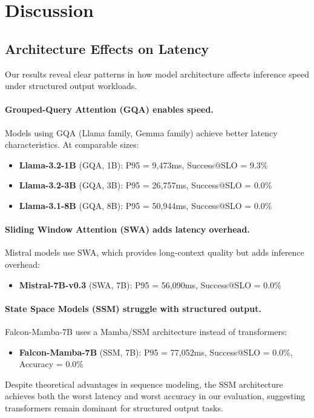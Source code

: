\documentclass[11pt]{article}
\begin{document}
\section{Discussion}
\label{sec:discussion}

\subsection{Architecture Effects on Latency}

Our results reveal clear patterns in how model architecture affects inference speed under structured output workloads.

\paragraph{Grouped-Query Attention (GQA) enables speed.}
Models using GQA (Llama family, Gemma family) achieve better latency characteristics.
At comparable sizes:
\begin{itemize}[leftmargin=12pt]
    \item \textbf{Llama-3.2-1B} (GQA, 1B): P95 = 9,473ms, Success@SLO = 9.3\%
    \item \textbf{Llama-3.2-3B} (GQA, 3B): P95 = 26,757ms, Success@SLO = 0.0\%
    \item \textbf{Llama-3.1-8B} (GQA, 8B): P95 = 50,944ms, Success@SLO = 0.0\%
\end{itemize}

\paragraph{Sliding Window Attention (SWA) adds latency overhead.}
Mistral models use SWA, which provides long-context quality but adds inference overhead:
\begin{itemize}[leftmargin=12pt]
    \item \textbf{Mistral-7B-v0.3} (SWA, 7B): P95 = 56,090ms, Success@SLO = 0.0\%
\end{itemize}

\paragraph{State Space Models (SSM) struggle with structured output.}
Falcon-Mamba-7B uses a Mamba/SSM architecture instead of transformers:
\begin{itemize}[leftmargin=12pt]
    \item \textbf{Falcon-Mamba-7B} (SSM, 7B): P95 = 77,052ms, Success@SLO = 0.0\%, Accuracy = 0.0\%
\end{itemize}
Despite theoretical advantages in sequence modeling, the SSM architecture achieves both the worst latency and worst accuracy in our evaluation, suggesting transformers remain dominant for structured output tasks.
\end{document}
